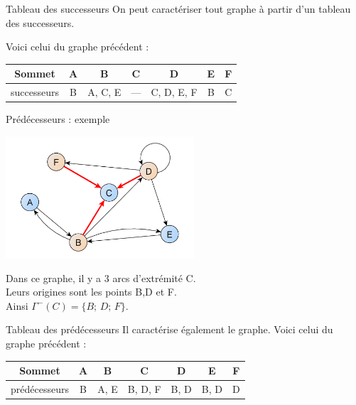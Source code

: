 \documentclass[10pt]{beamer}
\begin{document}
\begin{frame}{Tableau des successeurs}
On peut caractériser tout graphe à partir d'un \alert{tableau des successeurs}.\\\pause

Voici celui du graphe précédent :
\begin{center}
\begin{tabular}{|c|c|c|c|c|c|c|}
\hline\rowcolor{beamerBlack}
 \textbf{\color{beamerWhite}Sommet} & \textbf{\color{beamerWhite}A} & \textbf{\color{beamerWhite}B} &\textbf{\color{beamerWhite}C}& \textbf{\color{beamerWhite}D} & \textbf{\color{beamerWhite}E}& \textbf{\color{beamerWhite}F} \\
\hline
successeurs & B & A, C, E & --- & C, D, E, F & B & C \\
\hline
\end{tabular}
\end{center}
\end{frame}
\begin{frame}{Prédécesseurs : exemple}
\begin{center}
\includegraphics[width=7cm]{img/predecesseurs.png}
\end{center}
Dans ce graphe, il y a 3 arcs d'extrémité C.\\ \pause
Leurs origines sont les points B,D et F.\\\pause
Ainsi $\Gamma^-(C)=\{B;\,D;\,F\}$.
\end{frame}
\begin{frame}{Tableau des prédécesseurs}
Il caractérise également le graphe. Voici celui du graphe précédent :
\begin{center}
\begin{tabular}{|c|c|c|c|c|c|c|}
\hline\rowcolor{beamerBlack}
\textbf{\color{beamerWhite}Sommet} & \textbf{\color{beamerWhite}A} & \textbf{\color{beamerWhite}B} &\textbf{\color{beamerWhite}C}& \textbf{\color{beamerWhite}D} & \textbf{\color{beamerWhite}E}& \textbf{\color{beamerWhite}F} \\
\hline
prédécesseurs & B & A, E & B, D, F & B, D & B, D & D \\
\hline
\end{tabular}
\end{center}
\end{frame}
\end{document}
